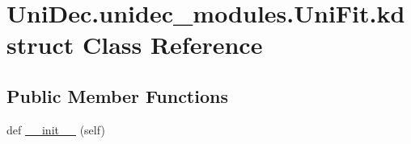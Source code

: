 \hypertarget{class_uni_dec_1_1unidec__modules_1_1_uni_fit_1_1kdstruct}{}\section{Uni\+Dec.\+unidec\+\_\+modules.\+Uni\+Fit.\+kdstruct Class Reference}
\label{class_uni_dec_1_1unidec__modules_1_1_uni_fit_1_1kdstruct}
\subsection*{Public Member Functions}
\begin{DoxyCompactItemize}
\item 
def \hyperlink{class_uni_dec_1_1unidec__modules_1_1_uni_fit_1_1kdstruct_a38e774ba9925944fc95dd18b65517c63}{\+\_\+\+\_\+init\+\_\+\+\_\+} (self)
\end{DoxyCompactItemize}
